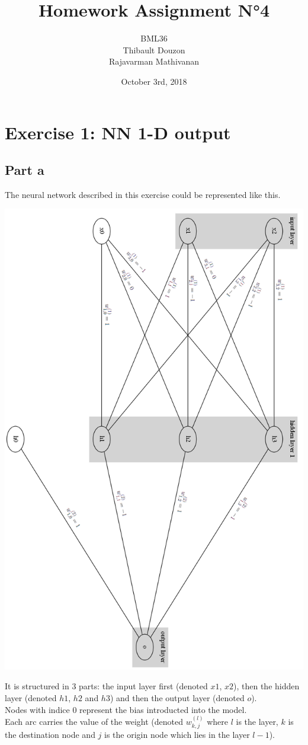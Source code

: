 \documentclass[a4paper, 10pt]{article}
\title{Homework Assignment N°4}
\author{BML36\\Thibault Douzon\\Rajavarman Mathivanan}
\date{October 3rd, 2018}
\begin{document}
\maketitle

\pagebreak

\tableofcontents

\pagebreak
\section{Exercise 1: NN 1-D output}
\subsection{Part a}
The neural network described in this exercise could be represented like this.
\begin{center}
\includegraphics[scale=0.5]{ex1_graph_export}
\end{center}
It is structured in 3 parts: the input layer first (denoted $x1$, $x2$), then the hidden layer
(denoted $h1$, $h2$ and $h3$) and then the output layer (denoted $o$).
\\
Nodes with indice 0 represent the bias introducted into the model.
\\ 
Each arc carries the value of the weight (denoted $w_{k,j}^{(l)}$ where $l$ is the layer, $k$ is the destination node
and $j$ is the origin node which lies in the layer $l-1$).
\end{document}
